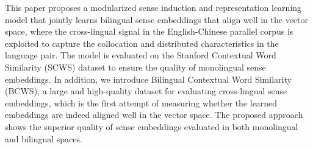 This paper proposes a modularized sense induction and representation learning model that jointly learns bilingual sense embeddings that align well in the vector space, where the cross-lingual signal in the English-Chinese parallel corpus is exploited to capture the collocation and distributed characteristics in the language pair. The model is evaluated on the Stanford Contextual Word Similarity (SCWS) dataset to ensure the quality of monolingual sense embeddings. In addition, we introduce Bilingual Contextual Word Similarity (BCWS), a large and high-quality dataset for evaluating cross-lingual sense embeddings, which is the first attempt of measuring whether the learned embeddings are indeed aligned well in the vector space. The proposed approach shows the superior quality of sense embeddings evaluated in both monolingual and bilingual spaces.
